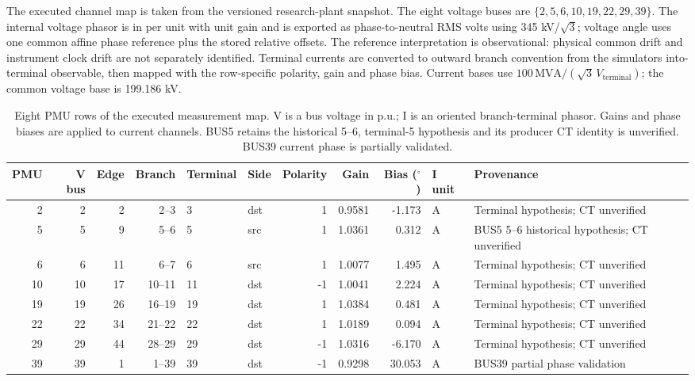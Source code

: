The executed channel map is taken from the versioned research-plant snapshot. The eight voltage buses are $\{2,5,6,10,19,22,29,39\}$. The internal voltage phasor is in per unit with unit gain and is exported as phase-to-neutral RMS volts using 345 kV/$\sqrt3$; voltage angle uses one common affine phase reference plus the stored relative offsets. The reference interpretation is observational: physical common drift and instrument clock drift are not separately identified. Terminal currents are converted to outward branch convention from the simulator\textquotesingle s into-terminal observable, then mapped with the row-specific polarity, gain and phase bias. Current bases use $100\,\mathrm{MVA}/(\sqrt{3}\,V_{\mathrm{terminal}})$; the common voltage base is 199.186 kV.\par
\begin{table}[t]\centering\scriptsize\setlength{\tabcolsep}{3pt}
\caption{Eight PMU rows of the executed measurement map. V is a bus voltage in p.u.; I is an oriented branch-terminal phasor. Gains and phase biases are applied to current channels. BUS5 retains the historical 5--6, terminal-5 hypothesis and its producer CT identity is unverified. BUS39 current phase is partially validated.}
\label{tab:f01-measurement-contract}
\begin{tabular}{@{}rrrrllrrrll@{}}\toprule
PMU & V bus & Edge & Branch & Terminal & Side & Polarity & Gain & Bias ($^\circ$) & I unit & Provenance \\\midrule
2 & 2 & 2 & 2--3 & 3 & dst & 1 & 0.9581 & -1.173 & A & Terminal hypothesis; CT unverified \\
5 & 5 & 9 & 5--6 & 5 & src & 1 & 1.0361 & 0.312 & A & BUS5 5--6 historical hypothesis; CT unverified \\
6 & 6 & 11 & 6--7 & 6 & src & 1 & 1.0077 & 1.495 & A & Terminal hypothesis; CT unverified \\
10 & 10 & 17 & 10--11 & 11 & dst & -1 & 1.0041 & 2.224 & A & Terminal hypothesis; CT unverified \\
19 & 19 & 26 & 16--19 & 19 & dst & 1 & 1.0384 & 0.481 & A & Terminal hypothesis; CT unverified \\
22 & 22 & 34 & 21--22 & 22 & dst & 1 & 1.0189 & 0.094 & A & Terminal hypothesis; CT unverified \\
29 & 29 & 44 & 28--29 & 29 & dst & -1 & 1.0316 & -6.170 & A & Terminal hypothesis; CT unverified \\
39 & 39 & 1 & 1--39 & 39 & dst & -1 & 0.9298 & 30.053 & A & BUS39 partial phase validation \\
\bottomrule\end{tabular}
\end{table}
